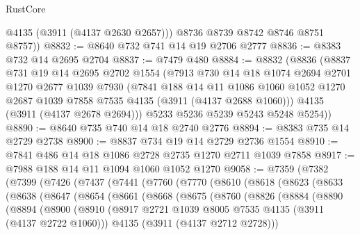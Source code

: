 \begin{lexlean}{RustCore}
\begin{coremodule}
          @4135
          (@3911 (@4137 @2630 @2657)))
        @8736
        @8739
        @8742
        @8746
        @8751
        @8757))
@8832 := @8640 @732 @741 @14 @19 @2706 @2777
@8836 := @8383 @732 @14 @2695 @2704
@8837 := @7479 @480
@8884 := @8832
    (@8836
      (@8837
        @731
        @19
        @14
        @2695
        @2702
        @1554
        (@7913
          @730
          @14
          @18
          @1074
          @2694
          @2701
          @1270
          @2677
          @1039
          @7930
          (@7841
            @188
            @14
            @11
            @1086
            @1060
            @1052
            @1270
            @2687
            @1039
            @7858
            @7535
            @4135
            (@3911 (@4137 @2688 @1060)))
          @4135
          (@3911 (@4137 @2678 @2694)))
        @5233
        @5236
        @5239
        @5243
        @5248
        @5254))
@8890 := @8640 @735 @740 @14 @18 @2740 @2776
@8894 := @8383 @735 @14 @2729 @2738
@8900 := @8837 @734 @19 @14 @2729 @2736 @1554
@8910 := @7841 @486 @14 @18 @1086 @2728 @2735 @1270 @2711 @1039 @7858
@8917 := @7988 @188 @14 @11 @1094 @1060 @1052 @1270
@9058 := @7359
    (@7382
      (@7399
        (@7426
          (@7437
            (@7441
              (@7760
                (@7770
                  (@8610
                    (@8618
                      (@8623
                        (@8633
                          (@8638
                            (@8647
                              (@8654
                                (@8661
                                  (@8668
                                    (@8675
                                      (@8760
                                        (@8826
                                          (@8884
                                            (@8890
                                              (@8894
                                                (@8900
                                                  (@8910
                                                    (@8917
                                                      @2721
                                                      @1039
                                                      @8005
                                                      @7535
                                                      @4135
                                                      (@3911 (@4137 @2722 @1060)))
                                                    @4135
                                                    (@3911 (@4137 @2712 @2728)))

\end{coremodule}
\end{lexlean}
